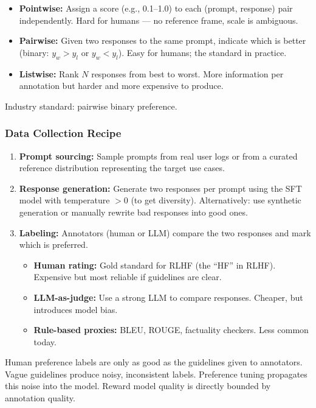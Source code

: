 \documentclass[11pt, a4paper]{article}
\begin{document}
\begin{defbox}
\begin{itemize}[leftmargin=1.5em]
  \item \textbf{Pointwise:} Assign a score (e.g., 0.1--1.0) to each (prompt, response) pair independently. Hard for humans --- no reference frame, scale is ambiguous.
  \item \textbf{Pairwise:} Given two responses to the same prompt, indicate which is better (binary: $y_w > y_l$ or $y_w < y_l$). Easy for humans; the standard in practice.
  \item \textbf{Listwise:} Rank $N$ responses from best to worst. More information per annotation but harder and more expensive to produce.
\end{itemize}
Industry standard: pairwise binary preference.
\end{defbox}

\subsubsection{Data Collection Recipe}

\begin{enumerate}[leftmargin=2em]
  \item \textbf{Prompt sourcing:} Sample prompts from real user logs or from a curated reference distribution representing the target use cases.
  \item \textbf{Response generation:} Generate two responses per prompt using the SFT model with temperature $> 0$ (to get diversity). Alternatively: use synthetic generation or manually rewrite bad responses into good ones.
  \item \textbf{Labeling:} Annotators (human or LLM) compare the two responses and mark which is preferred.
    \begin{itemize}[leftmargin=1.5em]
      \item \textbf{Human rating:} Gold standard for RLHF (the ``HF'' in RLHF). Expensive but most reliable if guidelines are clear.
      \item \textbf{LLM-as-judge:} Use a strong LLM to compare responses. Cheaper, but introduces model bias.
      \item \textbf{Rule-based proxies:} BLEU, ROUGE, factuality checkers. Less common today.
    \end{itemize}
\end{enumerate}

\begin{warnbox}
Human preference labels are only as good as the guidelines given to annotators. Vague guidelines produce noisy, inconsistent labels. Preference tuning propagates this noise into the model. Reward model quality is directly bounded by annotation quality.
\end{warnbox}
\end{document}
